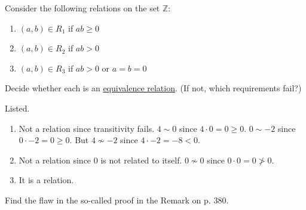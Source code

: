   \begin{exercise}
    Consider the following relations on the set $\mathbb{Z}$:
    \begin{enumerate}
      \item[(i)] $(a, b) \in R_1$ \quad if $ab \geq 0$
      \item[(ii)] $(a, b) \in R_2$ \quad if $ab > 0$
      \item[(iii)] $(a, b) \in R_3$ \quad if $ab > 0$ or $a = b = 0$
    \end{enumerate}
    Decide whether each is an \hyperref[def:equivalence_relation]{equivalence relation}. (If not, which requirements fail?)
  \end{exercise}
  \begin{solution}
    Listed. 
    \begin{enumerate}
      \item Not a relation since transitivity fails. $4 \sim 0$ since $4 \cdot 0 = 0 \geq 0$. $0 \sim -2$ since $0 \cdot -2 = 0 \geq 0$. But $4 \not\sim -2$ since $4 \cdot -2 = -8 < 0$. 
      \item Not a relation since $0$ is not related to itself. $0 \not\sim 0$ since $0 \cdot 0 = 0 \not> 0$. 
      \item It is a relation. 
    \end{enumerate}
  \end{solution}

  \begin{exercise}
    Find the flaw in the so-called proof in the Remark on p. 380.
  \end{exercise}

